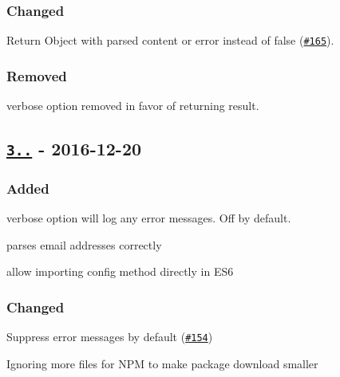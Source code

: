 \subsubsection*{Changed}


\begin{DoxyItemize}
\item Return Object with parsed content or error instead of false (\href{https://github.com/motdotla/dotenv/pull/165}{\tt \#165}).
\end{DoxyItemize}

\subsubsection*{Removed}


\begin{DoxyItemize}
\item {\ttfamily verbose} option removed in favor of returning result.
\end{DoxyItemize}

\subsection*{\href{https://github.com/motdotla/dotenv/compare/v2.0.0...v3.0.0}{\tt 3..} -\/ 2016-\/12-\/20}

\subsubsection*{Added}


\begin{DoxyItemize}
\item {\ttfamily verbose} option will log any error messages. Off by default.
\item parses email addresses correctly
\item allow importing config method directly in E\+S6
\end{DoxyItemize}

\subsubsection*{Changed}


\begin{DoxyItemize}
\item Suppress error messages by default (\href{https://github.com/motdotla/dotenv/pull/154}{\tt \#154})
\item Ignoring more files for N\+PM to make package download smaller
\end{DoxyItemize}

